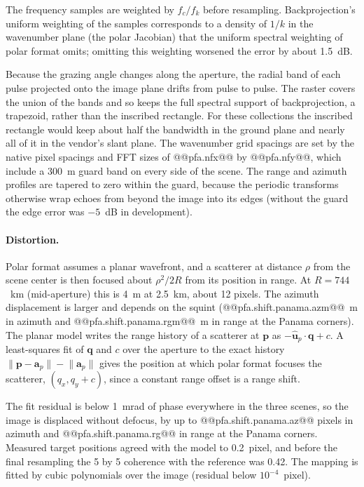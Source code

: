 \documentclass[11pt]{article}
\begin{document}
The frequency samples are weighted by $f_c / f_k$ before resampling. Backprojection's uniform weighting of the samples corresponds to a density of $1/k$ in the wavenumber plane (the polar Jacobian) that the uniform spectral weighting of polar format omits; omitting this weighting worsened the error by about 1.5~dB.

Because the grazing angle changes along the aperture, the radial band of each pulse projected onto the image plane drifts from pulse to pulse. The raster covers the union of the bands and so keeps the full spectral support of backprojection, a trapezoid, rather than the inscribed rectangle. For these collections the inscribed rectangle would keep about half the bandwidth in the ground plane and nearly all of it in the vendor's slant plane. The wavenumber grid spacings are set by the native pixel spacings and FFT sizes of @@pfa.nfx@@ by @@pfa.nfy@@, which include a 300~m guard band on every side of the scene. The range and azimuth profiles are tapered to zero within the guard, because the periodic transforms otherwise wrap echoes from beyond the image into its edges (without the guard the edge error was $-5$~dB in development).

\paragraph{Distortion.} Polar format assumes a planar wavefront, and a scatterer at distance $\rho$ from the scene center is then focused about $\rho^2/2R$ from its position in range. At $R = 744$~km (mid-aperture) this is 4~m at 2.5~km, about 12 pixels. The azimuth displacement is larger and depends on the squint (@@pfa.shift.panama.azm@@~m in azimuth and @@pfa.shift.panama.rgm@@~m in range at the Panama corners). The planar model writes the range history of a scatterer at $\mathbf{p}$ as $-\hat{\mathbf{u}}_p \cdot \mathbf{q} + c$. A least-squares fit of $\mathbf{q}$ and $c$ over the aperture to the exact history $\lVert \mathbf{p} - \mathbf{a}_p \rVert - \lVert \mathbf{a}_p \rVert$ gives the position at which polar format focuses the scatterer, $(q_x, q_y + c)$, since a constant range offset is a range shift.

The fit residual is below 1~mrad of phase everywhere in the three scenes, so the image is displaced without defocus, by up to @@pfa.shift.panama.az@@ pixels in azimuth and @@pfa.shift.panama.rg@@ in range at the Panama corners. Measured target positions agreed with the model to 0.2~pixel, and before the final resampling the 5 by 5 coherence with the reference was 0.42. The mapping is fitted by cubic polynomials over the image (residual below $10^{-4}$~pixel).
\end{document}
